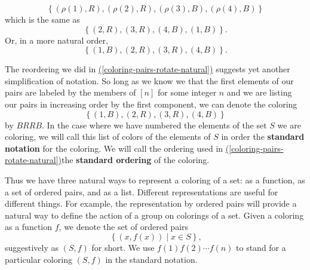 \documentclass[10pt,]{book}
\newcommand{\terminology}[1]{\textbf{#1}}
\theoremstyle{plain}
\theoremstyle{definition}
\theoremstyle{definition}
\numberwithin{equation}{chapter}
\begin{document}
\begin{equation}
\left\{(\rho(1),R),(\rho(2),R),(\rho(3),B),(\rho(4),B)\right\}\label{coloring-pairs-rotate}
\end{equation}
which is the same as%
\begin{equation*}
\left\{(2,R),(3,R),(4,B),(1,B)\right\}\text{.}
\end{equation*}
Or, in a more natural order,%
\begin{equation}
\left\{(1,B),(2,R),(3,R),(4,B)\right\}\text{.}\label{coloring-pairs-rotate-natural}
\end{equation}
%
\par
The reordering we did in \hyperref[coloring-pairs-rotate-natural]{(\ref{coloring-pairs-rotate-natural})} suggests yet another simplification of notation. So long as we know we that the first elements of our pairs are labeled by the members of \([n]\) for some integer \(n\) and we are listing our pairs in increasing order by the first component, we can denote the coloring%
\begin{equation*}
\left\{(1,B),(2,R),(3,R),(4,B)\right\}
\end{equation*}
by \(BRRB\). In the case where we have numbered the elements of the set \(S\) we are coloring, we will call this list of colors of the elements of \(S\) in order the \terminology{standard notation} for the coloring. We will call the ordering used in \hyperref[coloring-pairs-rotate-natural]{(\ref{coloring-pairs-rotate-natural})}the \terminology{standard ordering} of the coloring.%
\par
Thus we have three natural ways to represent a coloring of a set: as a function, as a set of ordered pairs, and as a list. Different representations are useful for different things. For example, the representation by ordered pairs will provide a natural way to define the action of a group on colorings of a set. Given a coloring as a function \(f\), we denote the set of ordered pairs%
\begin{equation*}
\left\{(x,f(x))\mid x\in S\right\}\text{,}
\end{equation*}
suggestively as \((S,f)\) for short. We use \(f(1)f(2)\cdots f(n)\) to stand for a particular coloring \((S,f)\) in the standard notation.%
\end{document}
